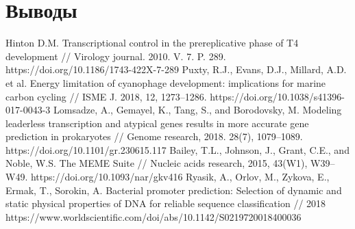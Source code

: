 \documentclass[a4paper,12pt]{article}
\begin{document}
\newpage
\section{Выводы}


\newpage
\begin{thebibliography}{9}
     Hinton D.M. Transcriptional control in the prereplicative phase of T4 development // Virology
    journal. 2010. V. 7. P. 289. https://doi.org/10.1186/1743-422X-7-289
     Puxty, R.J., Evans, D.J., Millard, A.D. et al. Energy limitation of cyanophage development:
    implications for marine carbon cycling // ISME J. 2018, 12, 1273–1286. https://doi.org/10.1038/s41396-017-0043-3
     Lomsadze, A., Gemayel, K., Tang, S., and Borodovsky, M. Modeling leaderless transcription and
    atypical genes results in more accurate gene prediction in prokaryotes // Genome research,  2018. 28(7), 1079–1089.
    https://doi.org/10.1101/gr.230615.117
     Bailey, T.L., Johnson, J., Grant, C.E., and Noble, W.S. The MEME Suite // Nucleic acids research,
    2015, 43(W1), W39–W49. https://doi.org/10.1093/nar/gkv416
     Ryasik, A., Orlov, M., Zykova, E., Ermak, T., Sorokin, A. Bacterial promoter prediction: Selection
    of dynamic and static physical properties of DNA for reliable sequence classification // 2018
    https://www.worldscientific.com/doi/abs/10.1142/S0219720018400036
    
\end{thebibliography}
\end{document}
